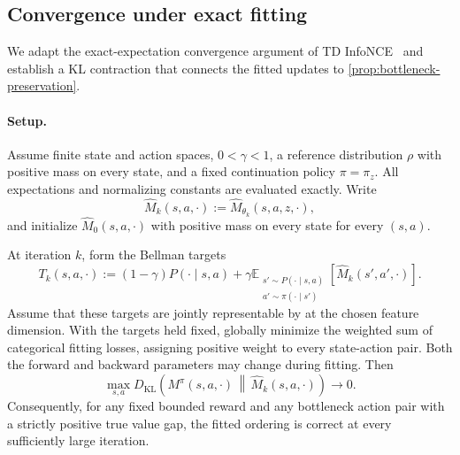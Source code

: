 \subsection{Convergence under exact fitting}
\label{app:exact-fitting-convergence}

We adapt the exact-expectation convergence argument of TD InfoNCE~\citep[Appendix~A]{zheng-iclr24a} and establish a KL contraction that connects the fitted updates to \cref{prop:bottleneck-preservation}.

\paragraph{Setup.}
Assume finite state and action spaces, $0<\gamma<1$, a reference distribution $\rho$ with positive mass on every state, and a fixed continuation policy $\pi=\pi_z$.
All expectations and normalizing constants are evaluated exactly.
Write
\[
    \widehat M_k(s,a,\cdot) :=\widehat M_{\theta_k}(s,a,z,\cdot),
\]
and initialize $\widehat M_0(s,a,\cdot)$ with positive mass on every state for every $(s,a)$.

At iteration $k$, form the Bellman targets
\[
    T_k(s,a,\cdot) :=(1-\gamma)P(\cdot\mid s,a) +\gamma \mathbb E_{\substack{ s'\sim P(\cdot\mid s,a)\\ a'\sim\pi(\cdot\mid s') }} \left[\widehat M_k(s',a',\cdot)\right].
\]
Assume that these targets are jointly representable by \name{} at the chosen feature dimension.
With the targets held fixed, globally minimize the weighted sum of categorical fitting losses, assigning positive weight to every state-action pair.
Both the forward and backward parameters may change during fitting.
Then
\[
    \max_{s,a} D_{\mathrm{KL}}\!\left( M^\pi(s,a,\cdot) \,\middle\|\, \widehat M_k(s,a,\cdot) \right) \longrightarrow 0.
\]
Consequently, for any fixed bounded reward and any bottleneck action pair with a strictly positive true value gap, the fitted ordering is correct at every sufficiently large iteration.

